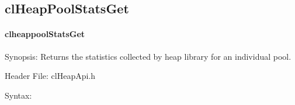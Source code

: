 \begin{flushleft}
\subsection{clHeapPoolStatsGet}
\hypertarget{pageheap129}{}\paragraph{cl\-heap\-pool\-Stats\-Get}\label{pageheap129}
\begin{Desc}
\item[Synopsis:]Returns the statistics collected by heap library for an individual pool.\end{Desc}
\begin{Desc}
\item[Header File:]clHeapApi.h\end{Desc}
\begin{Desc}
\item[Syntax:]


\end{Desc}
\end{flushleft}
